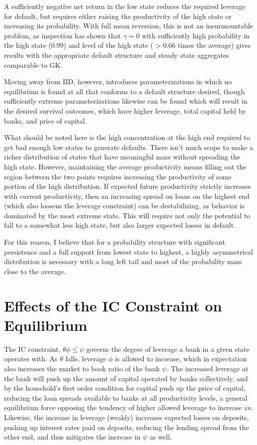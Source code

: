 \documentclass[english]{article}
\begin{document}
A sufficiently negative net return in the low state reduces the required leverage for default, but requires 
either raising the productivity of the high state or increasing its probability. With full mean reversion, this 
is not an insurmountable problem, as inspection has shown that $\gamma = 0$ with sufficiently high probability in the high state 
(0.99) and level of the high state ( > 0.66 times the average) gives results with the appropriate default structure  
and steady state aggregates comparable to GK. 

Moving away from IID, however, introduces parameterizations in which no equilibrium is found at all 
that conforms to a default structure desired, though sufficiently extreme parameterizations likewise can be found 
which will result in the desired survival outcomes, which have higher leverage, total capital held by banks, and price of capital.

What should be noted here is the high concentration at the high end required to get bad enough low states 
to generate defaults. There isn't much scope to make a richer distribution of states that have meaningful mass 
without spreading the high state. However, maintaining the average productivity means filling out the 
region between the two points requires increasing the productivity of some portion of the high distribution. 
If expected future productivity strictly increases with current productivity, then an increasing spread on loans 
on the highest end (which also loosens the leverage constraint) can be destabilizing, as behavior is dominated by 
the most extreme state. This will require not only the potential to fall to a somewhat less high state, but 
also larger expected losses in default.

For this reason, I believe that for a probability structure with significant persistence and a full 
support from lowest state to highest, a highly asymmetrical distribution is necessary with a long 
left tail and most of the probability mass close to the average.

\section{Effects of the IC Constraint on Equilibrium}
The IC constraint, $\theta\phi\leq\psi$ governs the degree of leverage a bank in a given state operates with.
As $\theta$ falls, leverage $\phi$ is allowed to increase, which in expectation also increases the market 
to book ratio of the bank $\psi$. The increased leverage at the bank will push up the amount of capital 
operated by banks collectively, and by the household's first order condition for capital push up the price 
of capital, reducing the loan spreads available to banks at all productivity levels, a general equilibrium force 
opposing the tendency of higher allowed leverage to increase $\psi$s. Likewise, the increase in 
leverage (weakly) increases expected losses on deposits, pushing up interest rates paid on deposits, reducing
the lending spread from the other end, and thus mitigates the increase in $\psi$ as well. 
\end{document}
